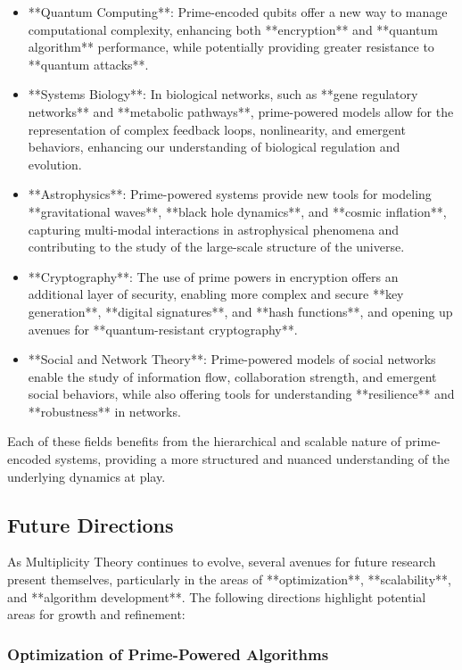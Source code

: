 \documentclass[12pt]{article}
\begin{document}
\begin{itemize}
    \item **Quantum Computing**: Prime-encoded qubits offer a new way to manage computational complexity, enhancing both **encryption** and **quantum algorithm** performance, while potentially providing greater resistance to **quantum attacks**.
    \item **Systems Biology**: In biological networks, such as **gene regulatory networks** and **metabolic pathways**, prime-powered models allow for the representation of complex feedback loops, nonlinearity, and emergent behaviors, enhancing our understanding of biological regulation and evolution.
    \item **Astrophysics**: Prime-powered systems provide new tools for modeling **gravitational waves**, **black hole dynamics**, and **cosmic inflation**, capturing multi-modal interactions in astrophysical phenomena and contributing to the study of the large-scale structure of the universe.
    \item **Cryptography**: The use of prime powers in encryption offers an additional layer of security, enabling more complex and secure **key generation**, **digital signatures**, and **hash functions**, and opening up avenues for **quantum-resistant cryptography**.
    \item **Social and Network Theory**: Prime-powered models of social networks enable the study of information flow, collaboration strength, and emergent social behaviors, while also offering tools for understanding **resilience** and **robustness** in networks.
\end{itemize}

Each of these fields benefits from the hierarchical and scalable nature of prime-encoded systems, providing a more structured and nuanced understanding of the underlying dynamics at play.

\subsection{Future Directions}

As Multiplicity Theory continues to evolve, several avenues for future research present themselves, particularly in the areas of **optimization**, **scalability**, and **algorithm development**. The following directions highlight potential areas for growth and refinement:

\subsubsection{Optimization of Prime-Powered Algorithms}
\end{document}
